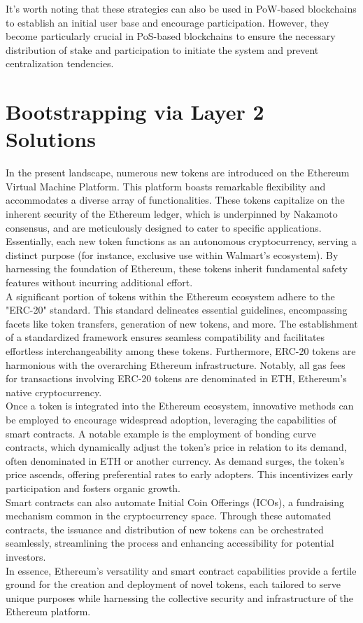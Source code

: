 \documentclass{report}
\begin{document}
It's worth noting that these strategies can also be used in PoW-based blockchains to establish an initial user base and encourage participation. However, they become particularly crucial in PoS-based blockchains to ensure the necessary distribution of stake and participation to initiate the system and prevent centralization tendencies.
\section{Bootstrapping via Layer 2 Solutions}
In the present landscape, numerous new tokens are introduced on the Ethereum Virtual Machine Platform. This platform boasts remarkable flexibility and accommodates a diverse array of functionalities. These tokens capitalize on the inherent security of the Ethereum ledger, which is underpinned by Nakamoto consensus, and are meticulously designed to cater to specific applications. Essentially, each new token functions as an autonomous cryptocurrency, serving a distinct purpose (for instance, exclusive use within Walmart's ecosystem). By harnessing the foundation of Ethereum, these tokens inherit fundamental safety features without incurring additional effort.\\
A significant portion of tokens within the Ethereum ecosystem adhere to the "ERC-20" standard. This standard delineates essential guidelines, encompassing facets like token transfers, generation of new tokens, and more. The establishment of a standardized framework ensures seamless compatibility and facilitates effortless interchangeability among these tokens. Furthermore, ERC-20 tokens are harmonious with the overarching Ethereum infrastructure. Notably, all gas fees for transactions involving ERC-20 tokens are denominated in ETH, Ethereum's native cryptocurrency.\\
Once a token is integrated into the Ethereum ecosystem, innovative methods can be employed to encourage widespread adoption, leveraging the capabilities of smart contracts. A notable example is the employment of bonding curve contracts, which dynamically adjust the token's price in relation to its demand, often denominated in ETH or another currency. As demand surges, the token's price ascends, offering preferential rates to early adopters. This incentivizes early participation and fosters organic growth.\\
Smart contracts can also automate Initial Coin Offerings (ICOs), a fundraising mechanism common in the cryptocurrency space. Through these automated contracts, the issuance and distribution of new tokens can be orchestrated seamlessly, streamlining the process and enhancing accessibility for potential investors.\\
In essence, Ethereum's versatility and smart contract capabilities provide a fertile ground for the creation and deployment of novel tokens, each tailored to serve unique purposes while harnessing the collective security and infrastructure of the Ethereum platform.
\end{document}
